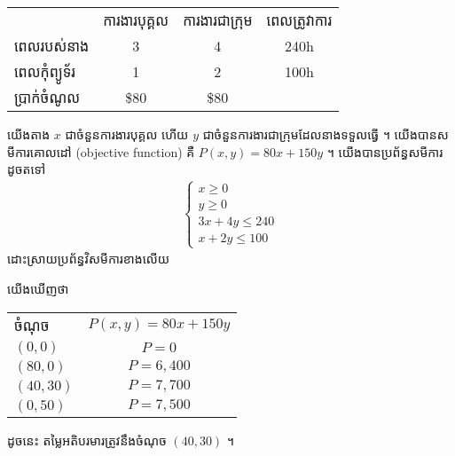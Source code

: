 \begin{solution}
  \text{}
	\begin{center}
    \begin{tabular}{l c c c}
      \toprule
      {}         &ការងារបុគ្គល    &ការងារជាក្រុម   &ពេលត្រូវាការ \\
      \cmidrule(r){2-2}
      \cmidrule(r){3-3}
      \cmidrule(r){4-4}
      ពេលរបស់នាង &3            &4           &240h\\
      ពេលកុំព្យូទ័រ   &1            &2           &100h\\
      \hline
      ប្រាក់ចំណូល  &\$80         &\$80         &{}\\
      \bottomrule
    \end{tabular}
  \end{center}
  យើងតាង $x$ ជាចំនួនការងារបុគ្គល  ហើយ $y$ ជាចំនួនការងារជាក្រុមដែលនាងទទួលធ្វើ ។
  យើងបានសមីការគោលដៅ (objective function) គឺ $P(x,y) = 80x+150y$ ។
  យើងបានប្រព័ន្ធសមីការដូចតទៅ
  \begin{align*}
  	\begin{cases}
    	x\geq 0\\
      y\geq 0\\
      3x+4y \leq 240\\
      x+2y \leq 100
    \end{cases}
  \end{align*}
  ដោះស្រាយប្រព័ន្ធវិសមីការខាងលើយ
  \begin{center}
  \end{center}

  យើងឃើញថា
  \begin{center}
    \begin{tabular}{l c}
      \toprule
      ចំណុច       & $P(x,y)=80x+150y$\\
      \cmidrule(r){1-1} \cmidrule(l){2-2}
      $(0,0)$     & $P=0$\\
      $(80,0)$    & $P=6,400$\\
      $(40,30)$   & $P=7,700$\\
      $(0,50)$    & $P=7,500$\\
      \bottomrule
    \end{tabular}
  \end{center}
  ដូចនេះ តម្លៃអតិបរមារត្រូវនឹងចំណុច $(40,30)$ ។
\end{solution}



